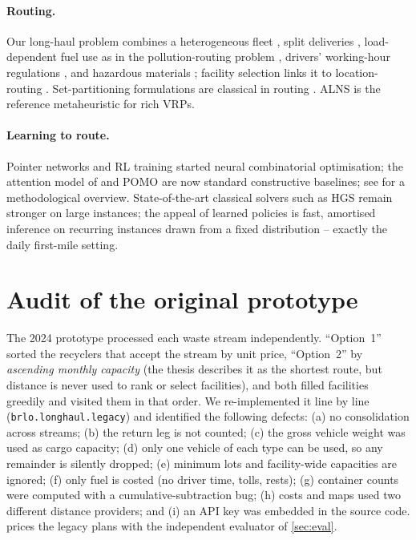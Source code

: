 \documentclass[11pt,a4paper]{article}
\begin{document}
\paragraph{Routing.} Our long-haul problem combines a heterogeneous fleet \citep{koc2016}, split deliveries \citep{archetti2012}, load-dependent fuel use as in the pollution-routing problem \citep{bektas2011,xiao2012}, drivers' working-hour regulations \citep{goel2009}, and hazardous materials \citep{erkut2007}; facility selection links it to location-routing \citep{prodhon2014}. Set-partitioning formulations are classical in routing \citep{toth2014}. ALNS \citep{ropke2006} is the reference metaheuristic for rich VRPs.
\paragraph{Learning to route.} Pointer networks \citep{vinyals2015} and RL training \citep{bello2016,nazari2018} started neural combinatorial optimisation; the attention model of \citet{kool2019} and POMO \citep{kwon2020} are now standard constructive baselines; see \citet{bengio2021} for a methodological overview. State-of-the-art classical solvers such as HGS \citep{vidal2022,wouda2024} remain stronger on large instances; the appeal of learned policies is fast, amortised inference on recurring instances drawn from a fixed distribution -- exactly the daily first-mile setting.

\section{Audit of the original prototype}
\label{sec:audit}
The 2024 prototype \citep{lozano2024} processed each waste stream independently. ``Option~1'' sorted the recyclers that accept the stream by unit price, ``Option~2'' by \emph{ascending monthly capacity} (the thesis describes it as the shortest route, but distance is never used to rank or select facilities), and both filled facilities greedily and visited them in that order. We re-implemented it line by line (\texttt{brlo.longhaul.legacy}) and identified the following defects: (a) no consolidation across streams; (b) the return leg is not counted; (c) the gross vehicle weight was used as cargo capacity; (d) only one vehicle of each type can be used, so any remainder is silently dropped; (e) minimum lots and facility-wide capacities are ignored; (f) only fuel is costed (no driver time, tolls, rests); (g) container counts were computed with a cumulative-subtraction bug; (h) costs and maps used two different distance providers; and (i) an API key was embedded in the source code.  prices the legacy plans with the independent evaluator of \cref{sec:eval}.
\end{document}
